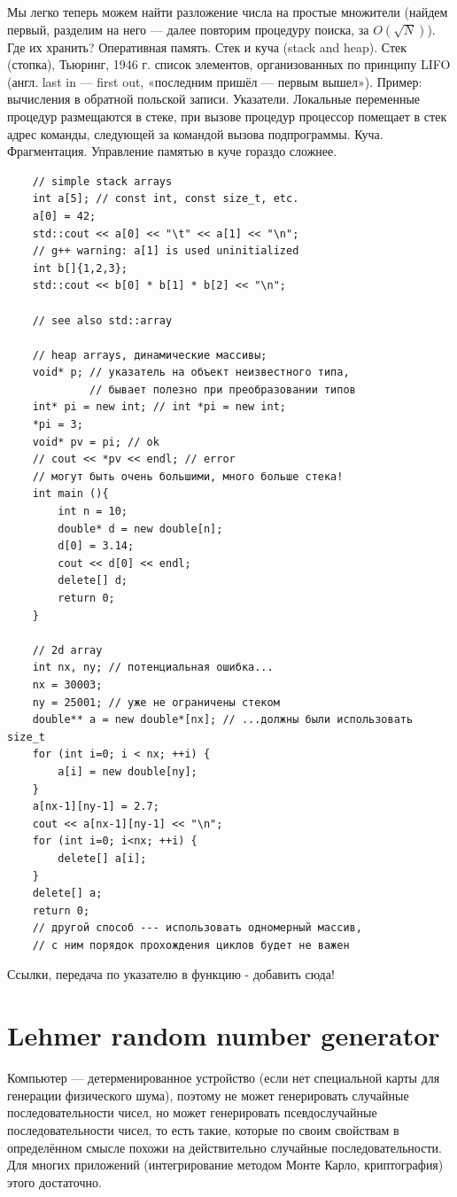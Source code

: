 \documentclass{book}
\begin{document}
Мы легко теперь можем найти разложение числа на простые множители (найдем первый, разделим на него
--- далее повторим процедуру поиска, за $O(\sqrt{N})$). Где их хранить? Оперативная память. Стек и
куча (stack and heap). Стек (стопка), Тьюринг, 1946 г. список элементов, организованных по принципу LIFO
(англ. last in — first out, «последним пришёл — первым вышел»). Пример: вычисления в обратной
польской записи. Указатели. Локальные переменные
процедур размещаются в стеке, при вызове процедур процессор помещает в стек адрес команды,
следующей за командой вызова подпрограммы. Куча. Фрагментация. Управление памятью в куче гораздо сложнее.

\begin{verbatim}
    // simple stack arrays
    int a[5]; // const int, const size_t, etc.
    a[0] = 42;
    std::cout << a[0] << "\t" << a[1] << "\n";
    // g++ warning: a[1] is used uninitialized
    int b[]{1,2,3};
    std::cout << b[0] * b[1] * b[2] << "\n";

    // see also std::array

    // heap arrays, динамические массивы;
    void* p; // указатель на объект неизвестного типа,
             // бывает полезно при преобразовании типов
    int* pi = new int; // int *pi = new int;
    *pi = 3;
    void* pv = pi; // ok
    // cout << *pv << endl; // error
    // могут быть очень большими, много больше стека!
    int main (){
        int n = 10;
        double* d = new double[n];
        d[0] = 3.14;
        cout << d[0] << endl;
        delete[] d;
        return 0;
    }

    // 2d array
    int nx, ny; // потенциальная ошибка...
    nx = 30003;
    ny = 25001; // уже не ограничены стеком
    double** a = new double*[nx]; // ...должны были использовать size_t
    for (int i=0; i < nx; ++i) {
        a[i] = new double[ny];
    }
    a[nx-1][ny-1] = 2.7;
    cout << a[nx-1][ny-1] << "\n";
    for (int i=0; i<nx; ++i) {
        delete[] a[i];
    }
    delete[] a;
    return 0;
    // другой способ --- использовать одномерный массив,
    // с ним порядок прохождения циклов будет не важен
\end{verbatim}

Ссылки, передача по указателю в функцию - добавить сюда!

\section{Lehmer random number generator}

Компьютер --- детерменированное устройство (если нет специальной карты для генерации физического
шума), поэтому не может генерировать случайные последовательности чисел, но может генерировать
псевдослучайные последовательности чисел, то есть такие, которые по своим свойствам в определённом
смысле похожи на действительно случайные последовательности. Для многих приложений (интегрирование
методом Монте Карло, криптография) этого достаточно.
\end{document}
